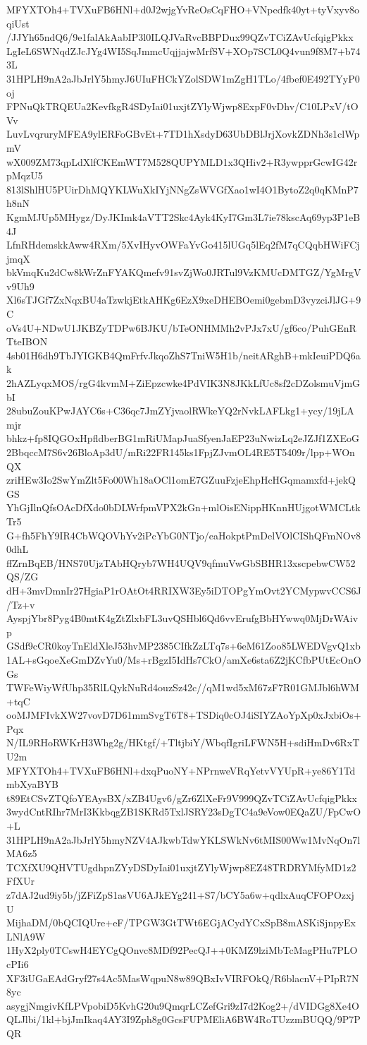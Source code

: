 MFYXTOh4+TVXuFB6HNl+d0J2wjgYvReOsCqFHO+VNpedfk40yt+tyVxyv8oqiUst
/JJYh65ndQ6/9e1falAkAabIP3l0ILQJVaRvcBBPDux99QZvTCiZAvUcfqigPkkx
LgIeL6SWNqdZJcJYg4WI5SqJmmcUqjjajwMrfSV+XOp7SCL0Q4vun9f8M7+b743L
31HPLH9nA2aJbJrlY5hmyJ6UIuFHCkYZolSDW1mZgH1TLo/4fbef0E492TYyP0oj
FPNuQkTRQEUa2KevfkgR4SDyIai01uxjtZYlyWjwp8ExpF0vDhv/C10LPxV/tOVv
LuvLvqruryMFEA9ylERFoGBvEt+7TD1hXsdyD63UbDBlJrjXovkZDNh3s1clWpmV
wX009ZM73qpLdXlfCKEmWT7M528QUPYMLD1x3QHiv2+R3ywpprGcwIG42rpMqzU5
813lShlHU5PUirDhMQYKLWuXkIYjNNgZsWVGfXao1wI4O1BytoZ2q0qKMnP7h8nN
KgmMJUp5MHygz/DyJKImk4aVTT2Skc4Ayk4KyI7Gm3L7ie78kscAq69yp3P1eB4J
LfnRHdemskkAww4RXm/5XvIHyvOWFaYvGo415lUGq5lEq2fM7qCQqbHWiFCjjmqX
bkVmqKu2dCw8kWrZnFYAKQmefv91svZjWo0JRTul9VzKMUcDMTGZ/YgMrgVv9Uh9
Xl6sTJGf7ZxNqxBU4aTzwkjEtkAHKg6EzX9xeDHEBOemi0gebmD3vyzciJlJG+9C
oVs4U+NDwU1JKBZyTDPw6BJKU/bTeONHMMh2vPJx7xU/gf6co/PuhGEnRTteIBON
4sb01H6dh9TbJYIGKB4QmFrfvJkqoZhS7TniW5H1b/neitARghB+mkIeuiPDQ6ak
2hAZLyqxMOS/rgG4kvmM+ZiEpzcwke4PdVIK3N8JKkLfUc8sf2cDZolsmuVjmGbI
28ubuZouKPwJAYC6s+C36qc7JmZYjvaolRWkeYQ2rNvkLAFLkg1+ycy/19jLAmjr
bhkz+fp8IQGOxHpfldberBG1mRiUMapJuaSfyenJaEP23uNwizLq2eJZJf1ZXEoG
2BbqccM7S6v26BloAp3dU/mRi22FR145ks1FpjZJvmOL4RE5T5409r/lpp+WOnQX
zriHEw3Io2SwYmZlt5Fo00Wh18aOCl1omE7GZuuFzjeEhpHcHGqmamxfd+jekQGS
YhGjIlnQfsOAcDfXdo0bDLWrfpmVPX2kGn+mlOisENippHKnnHUjgotWMCLtkTr5
G+fh5FhY9IR4CbWQOVhYv2iPcYbG0NTjo/eaHokptPmDelVOlCIShQFmNOv80dhL
ffZrnBqEB/HNS70UjzTAbHQryb7WH4UQV9qfmuVwGbSBHR13xscpebwCW52QS/ZG
dH+3mvDmnIr27HgiaP1rOAtOt4RRIXW3Ey5iDTOPgYmOvt2YCMypwvCCS6J/Tz+v
AyspjYbr8Pyg4B0mtK4gZtZlxbFL3uvQSHbl6Qd6vvErufgBbHYwwq0MjDrWAivp
GSdf9cCR0koyTnEldXleJ53hvMP2385CIfkZzLTq7s+6eM61Zoo85LWEDVgvQ1xb
1AL+sGqoeXeGmDZvYu0/Ms+rBgzI5IdHs7CkO/amXe6sta6Z2jKCfbPUtEcOnOGs
TWFeWiyWfUhp35RlLQykNuRd4ouzSz42c//qM1wd5xM67zF7R01GMJbl6hWM+tqC
ooMJMFIvkXW27vovD7D61mmSvgT6T8+TSDiq0cOJ4iSIYZAoYpXp0xJxbiOs+Pqx
N/IL9RHoRWKrH3Whg2g/HKtgf/+TltjbiY/WbqfIgriLFWN5H+sdiHmDv6RxTU2m
MFYXTOh4+TVXuFB6HNl+dxqPuoNY+NPrnweVRqYetvVYUpR+ye86Y1TdmbXyaBYB
t89EtCSvZTQfoYEAysBX/xZB4Ugv6/gZr6ZlXeFr9V999QZvTCiZAvUcfqigPkkx
3wydCntRIhr7MrI3KkbqgZB1SKRd5TxlJSRY23sDgTC4a9eVow0EQaZU/FpCwO+L
31HPLH9nA2aJbJrlY5hmyNZV4AJkwbTdwYKLSWkNv6tMIS00Ww1MvNqOn7lMA6z5
TCXfXU9QHVTUgdhpnZYyDSDyIai01uxjtZYlyWjwp8EZ48TRDRYMfyMD1z2FfXUr
z7dAJ2ud9iy5b/jZFiZpS1asVU6AJkEYg241+S7/bCY5a6w+qdlxAuqCFOPOzxjU
MijhaDM/0bQCIQUre+eF/TPGW3GtTWt6EGjACydYCxSpB8mASKiSjnpyExLNlA9W
1HyX2ply0TCswH4EYCgQOnvc8MDf92PecQJ++0KMZ9lziMbTcMagPHu7PLOcPIi6
XF3iUGaEAdGryf27s4Ac5MasWqpuN8w89QBxIvVIRFOkQ/R6blacnV+PIpR7N8yc
asygjNmgivKfLPVpobiD5KvhG20u9QmqrLCZefGri9zI7d2Kog2+/dVIDGg8Xe4O
QLJlbi/1kl+bjJmIkaq4AY3I9Zph8g0GcsFUPMEliA6BW4RoTUzzmBUQQ/9P7PQR
